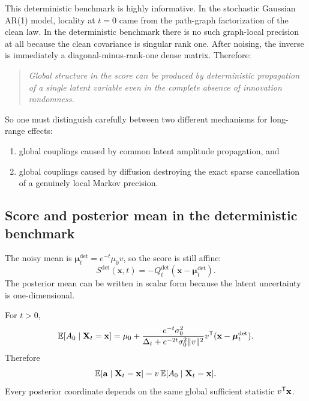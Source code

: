 \documentclass[11pt]{article}
\begin{document}
This deterministic benchmark is highly informative. In the stochastic Gaussian AR(1) model, locality at $t=0$ came from the path-graph factorization of the clean law. In the deterministic benchmark there is no such graph-local precision at all because the clean covariance is singular rank one. After noising, the inverse is immediately a diagonal-minus-rank-one dense matrix. Therefore:
\begin{quote}
\emph{Global structure in the score can be produced by deterministic propagation of a single latent variable even in the complete absence of innovation randomness.}
\end{quote}
So one must distinguish carefully between two different mechanisms for long-range effects:
\begin{enumerate}[label=(\alph*),leftmargin=1cm]
\item global couplings caused by common latent amplitude propagation, and
\item global couplings caused by diffusion destroying the exact sparse cancellation of a genuinely local Markov precision.
\end{enumerate}

\subsection{Score and posterior mean in the deterministic benchmark}

The noisy mean is $\boldsymbol\mu_t^{\mathrm{det}}=e^{-t}\mu_0v$, so the score is still affine:
\begin{equation}
 S^{\mathrm{det}}(\mathbf x,t)
 =-Q_t^{\mathrm{det}}(\mathbf x-\boldsymbol\mu_t^{\mathrm{det}}).
\end{equation}
The posterior mean can be written in scalar form because the latent uncertainty is one-dimensional.

\begin{proposition}
For $t>0$,
\begin{equation}\label{eq:det_scalar_posterior}
 \mathbb{E}[A_0\mid \mathbf X_t=\mathbf x]
 =\mu_0+
 \frac{e^{-t}\sigma_0^2}{\Delta_t+e^{-2t}\sigma_0^2\lVert v\rVert^2}
 v^{\mathsf{T}}(\mathbf x-\boldsymbol\mu_t^{\mathrm{det}}).
\end{equation}
Therefore
\begin{equation}
 \mathbb{E}[\mathbf a\mid \mathbf X_t=\mathbf x]
 =v\,\mathbb{E}[A_0\mid \mathbf X_t=\mathbf x].
\end{equation}
Every posterior coordinate depends on the same global sufficient statistic $v^{\mathsf{T}}\mathbf x$.
\end{proposition}
\end{document}
